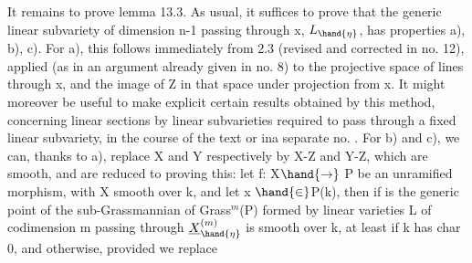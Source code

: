 
It remains to prove lemma 13.3. As usual, it suffices to prove
that the generic linear subvariety of dimension n-1 passing through x,
$L_{\hand{\eta}}$, has properties a), b), c). For a),  this follows 
immediately from 2.3 (revised and corrected in no. 12), applied (as in an
argument already given in no. 8) to the projective space of lines
through x, and the image of Z in that space under projection from
x. \hand{[}It might moreover be useful to make explicit certain
 results obtained by this method, concerning linear sections
by linear subvarieties required to pass through a fixed linear
subvariety, in the course of the text or in\hand{/}a separate no. \hand{]}. For  b) and c),
 we can, thanks to a), replace X and Y respectively by X-Z and Y-Z,
which are smooth, and are reduced to proving this: let f: X$\hand{\rightarrow}$ P be an
unramified morphism, \hand{(}with X smooth over k, and let x $\hand{\in}$P(k), then if
\hand{$\eta$} is the generic point of  the sub-Grassmannian of Grass$^{m}$(P)
formed by linear varieties L of codimension m passing through  
  $\underline{X}^{(m)}_{\hand{\eta}}$ is smooth over k, at
 least if k has char 0, and otherwise, provided we replace
